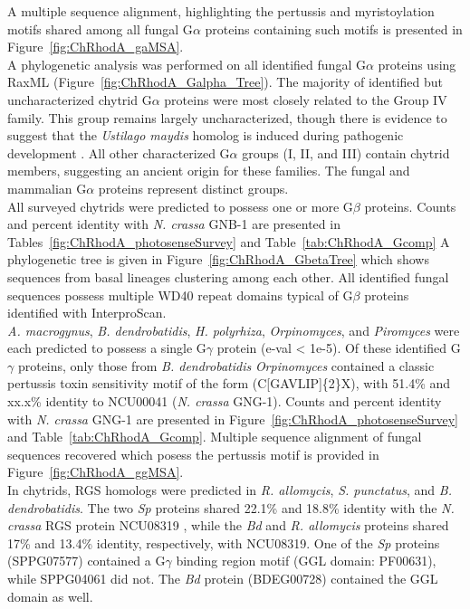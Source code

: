 \indent A multiple sequence alignment, highlighting the pertussis and myristoylation motifs shared among all fungal G$\alpha$ proteins containing such motifs is presented in Figure~\ref{fig:ChRhodA_gaMSA}.\\
\indent A phylogenetic analysis was performed on all identified fungal G$\alpha$ proteins using RaxML (Figure~\ref{fig:ChRhodA_Galpha_Tree}). The majority of identified but uncharacterized chytrid G$\alpha$ proteins were most closely related to the Group IV family. This group remains largely uncharacterized, though there is evidence to suggest that the \textit{Ustilago maydis} homolog is induced during pathogenic development \cite{Bolker1998}. All other characterized G$\alpha$ groups (I, II, and III) contain chytrid members, suggesting an ancient origin for these families. The fungal and mammalian G$\alpha$ proteins represent distinct groups.\\

\indent All surveyed chytrids were predicted to possess one or more G$\beta$ proteins. Counts and percent identity with \textit{N. crassa} GNB-1 are presented in Tables~\ref{fig:ChRhodA_photosenseSurvey} and Table~\ref{tab:ChRhodA_Gcomp} A phylogenetic
tree is given in Figure~\ref{fig:ChRhodA_GbetaTree} which shows sequences from basal lineages
clustering among each other. All identified fungal sequences possess multiple WD40 repeat domains
typical of G$\beta$ proteins identified with InterproScan. \\

\indent \textit{A. macrogynus}, \textit{B. dendrobatidis}, \textit{H. polyrhiza}, \textit{Orpinomyces}, and \textit{Piromyces} were each predicted to possess a single G$\gamma$ protein (e-val < 1e-5). Of these identified G$\gamma$ proteins, only those from \textit{B. dendrobatidis} \textit{Orpinomyces} contained a classic pertussis toxin sensitivity motif of the form (C[GAVLIP]\{2\}X), with 51.4\% and xx.x\% identity to NCU00041 (\textit{N. crassa} GNG-1). Counts and percent identity with \textit{N. crassa} GNG-1 are presented in Figure~\ref{fig:ChRhodA_photosenseSurvey} and Table~\ref{tab:ChRhodA_Gcomp}. Multiple sequence alignment of fungal sequences recovered which posess the pertussis motif is provided in Figure~\ref{fig:ChRhodA_ggMSA}.\\

\indent In chytrids, RGS homologs were predicted in \textit{R. allomycis}, \textit{S. punctatus}, and \textit{B. dendrobatidis}. The two \textit{Sp} proteins shared 22.1\% and 18.8\% identity with the \textit{N. crassa} RGS protein NCU08319 \cite{Borkovich2004}, while the \textit{Bd} and \textit{R. allomycis} proteins shared 17\% and 13.4\% identity, respectively, with NCU08319. One of the \textit{Sp} proteins (SPPG07577) contained a G$\gamma$ binding region motif (GGL domain: PF00631), while SPPG04061 did not. The \textit{Bd} protein (BDEG00728) contained the GGL domain as well.\\

